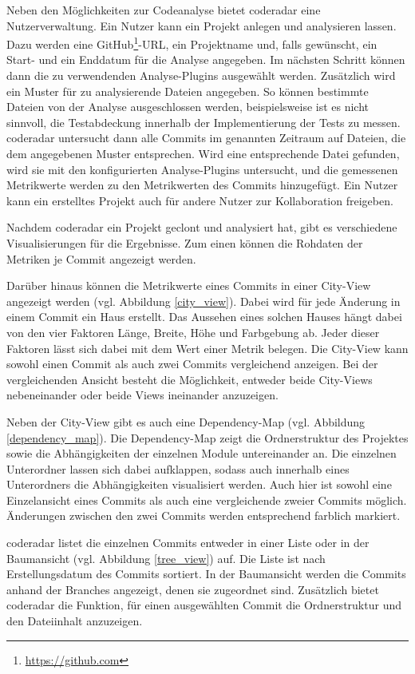 \documentclass[
	oneside,  %
	ngerman, 
	final, 
	11pt, 
	a4paper, 
	1.1headlines, 
	headinclude=false, 
	footinclude=false, 
	mpinclude=false, 
	pagesize, 
	onecolumn, 
	titlepage, 
	parskip=half, 
	headsepline, 
	chapterprefix=false, 
	version=first, 
	listof=totoc, 
	bibliography=totoc, 
	toc=graduated, 
	fleqn
]{scrbook}
\begin{document}
Neben den Möglichkeiten zur Codeanalyse bietet coderadar eine Nutzerverwaltung.
Ein Nutzer kann ein Projekt anlegen und analysieren lassen.
Dazu werden eine GitHub\footnote{\url{https://github.com}}-URL, ein Projektname und, falls gewünscht, ein Start- und ein Enddatum für die Analyse angegeben.
Im nächsten Schritt können dann die zu verwendenden Analyse-Plugins ausgewählt werden.
Zusätzlich wird ein Muster für zu analysierende Dateien angegeben.
So können bestimmte Dateien von der Analyse ausgeschlossen werden, beispielsweise ist es nicht sinnvoll, die Testabdeckung innerhalb der Implementierung der Tests zu messen.
coderadar untersucht dann alle Commits im genannten Zeitraum auf Dateien, die dem angegebenen Muster entsprechen.
Wird eine entsprechende Datei gefunden, wird sie mit den konfigurierten Analyse-Plugins untersucht, und die gemessenen Metrikwerte werden zu den Metrikwerten des Commits hinzugefügt.
Ein Nutzer kann ein erstelltes Projekt auch für andere Nutzer zur Kollaboration freigeben.

Nachdem coderadar ein Projekt geclont und analysiert hat, gibt es verschiedene Visualisierungen für die Ergebnisse.
Zum einen können die Rohdaten der Metriken je Commit angezeigt werden.

Darüber hinaus können die Metrikwerte eines Commits in einer \glqq City-View\grqq{} angezeigt werden (vgl. Abbildung \ref{city_view}).
Dabei wird für jede Änderung in einem Commit ein \glqq Haus\grqq{} erstellt.
Das Aussehen eines solchen Hauses hängt dabei von den vier Faktoren Länge, Breite, Höhe und Farbgebung ab.
Jeder dieser Faktoren lässt sich dabei mit dem Wert einer Metrik belegen.
Die City-View kann sowohl einen Commit als auch zwei Commits vergleichend anzeigen.
Bei der vergleichenden Ansicht besteht die Möglichkeit, entweder beide City-Views nebeneinander oder beide Views ineinander anzuzeigen.

Neben der City-View gibt es auch eine \glqq Dependency-Map\grqq{} (vgl. Abbildung \ref{dependency_map}).
Die Dependency-Map zeigt die Ordnerstruktur des Projektes sowie die Abhängigkeiten der einzelnen Module untereinander an.
Die einzelnen Unterordner lassen sich dabei aufklappen, sodass auch innerhalb eines Unterordners die Abhängigkeiten visualisiert werden.
Auch hier ist sowohl eine Einzelansicht eines Commits als auch eine vergleichende zweier Commits möglich.
Änderungen zwischen den zwei Commits werden entsprechend farblich markiert.

coderadar listet die einzelnen Commits entweder in einer Liste oder in der Baumansicht (vgl. Abbildung \ref{tree_view}) auf.
Die Liste ist nach Erstellungsdatum des Commits sortiert. 
In der Baumansicht werden die Commits anhand der Branches angezeigt, denen sie zugeordnet sind.
Zusätzlich bietet coderadar die Funktion, für einen ausgewählten Commit die Ordnerstruktur und den Dateiinhalt anzuzeigen.
\end{document}
